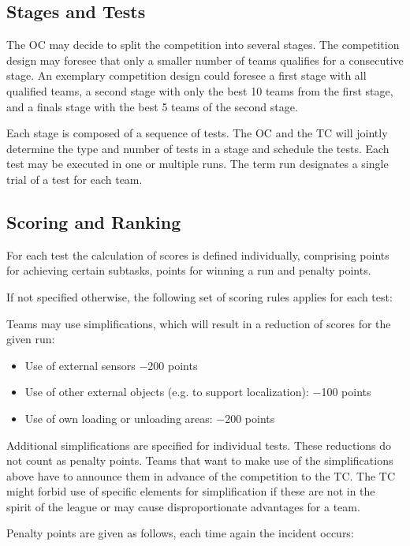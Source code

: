 \subsection{Stages and Tests}
The OC may decide to split the competition into several stages. The competition design may foresee that only a smaller number of teams qualifies for a consecutive stage. An exemplary competition design could foresee a first stage with all qualified teams, a second stage with only the best 10 teams from the first stage, and a finals stage with the best 5 teams of the second stage.
\par
Each stage is composed of a sequence of tests. The OC and the TC will jointly determine the type and number of tests in a stage and schedule the tests.
Each test may be executed in one or multiple runs. The term run designates a single trial of a test for each team.

\subsection{Scoring and Ranking}
For each test the calculation of scores is defined individually, comprising points for achieving certain subtasks, points for winning a run and penalty points.
\par
If not specified otherwise, the following set of scoring rules applies for each test:
\par
Teams may use simplifications, which will result in a reduction of scores for the given run:

\begin{itemize}
	\item Use of external sensors                        −200 points
	\item Use of other external objects (e.g. to support localization):         −100 points
	\item Use of own loading or unloading areas:                 −200 points
\end{itemize}

Additional simplifications are specified for individual tests. These reductions do not count as penalty points. Teams that want to make use of the simplifications above have to announce them in advance of the competition to the TC. The TC might forbid use of specific elements for simplification if these are not in the spirit of the league or may cause disproportionate advantages for a team.
\par
Penalty points are given as follows, each time again the incident occurs:

